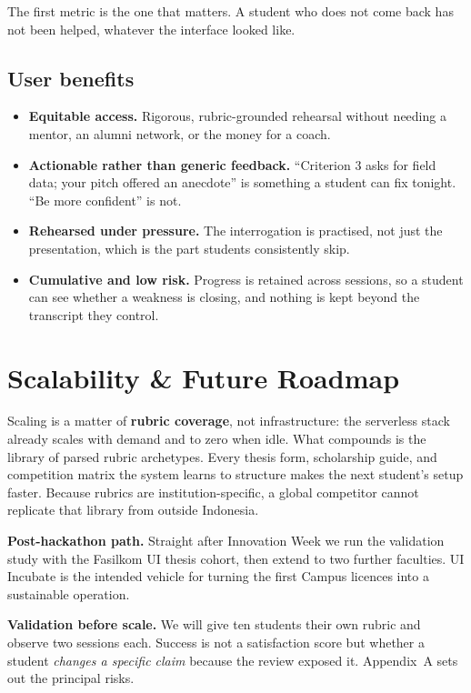 The first metric is the one that matters. A student who does not come back has
not been helped, whatever the interface looked like.

\subsection{User benefits}

\begin{itemize}
  \item \textbf{Equitable access.} Rigorous, rubric-grounded rehearsal without
        needing a mentor, an alumni network, or the money for a coach.
  \item \textbf{Actionable rather than generic feedback.} ``Criterion 3 asks
        for field data; your pitch offered an anecdote'' is something a student
        can fix tonight. ``Be more confident'' is not.
  \item \textbf{Rehearsed under pressure.} The interrogation is practised, not
        just the presentation, which is the part students consistently skip.
  \item \textbf{Cumulative and low risk.} Progress is retained across sessions,
        so a student can see whether a weakness is closing, and nothing is kept
        beyond the transcript they control.
\end{itemize}

\section{Scalability \& Future Roadmap}



Scaling is a matter of \textbf{rubric coverage}, not infrastructure: the
serverless stack already scales with demand and to zero when idle. What
compounds is the library of parsed rubric archetypes. Every thesis form,
scholarship guide, and competition matrix the system learns to structure makes
the next student's setup faster. Because rubrics are institution-specific, a
global competitor cannot replicate that library from outside Indonesia.

\textbf{Post-hackathon path.} Straight after Innovation Week we run the
validation study with the Fasilkom UI thesis cohort, then extend to two further
faculties. UI Incubate is the intended vehicle for turning the first Campus
licences into a sustainable operation.

\textbf{Validation before scale.} We will give ten students their own rubric
and observe two sessions each. Success is not a satisfaction score but whether a
student \emph{changes a specific claim} because the review exposed it.
Appendix~A sets out the principal risks.
